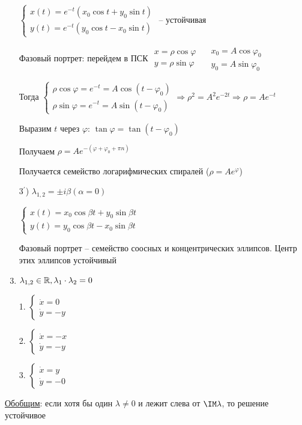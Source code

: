 \documentclass[12pt]{article}
\begin{document}
\begin{enumerate}[label*=\arabic*) ]
        $\begin{cases}x(t) = e^{-t} (x_0 \cos t + y_0 \sin t) \\ y(t) = e^{-t} (y_0 \cos t - x_0 \sin t)\end{cases}$ -- устойчивая

        Фазовый портрет: перейдем в ПСК $\begin{matrix}x = \rho \cos \varphi \\ y = \rho \sin \varphi\end{matrix} \quad \begin{matrix}x_0 = A\cos \varphi_0 \\ y_0 = A \sin \varphi_0\end{matrix}$

        Тогда $\begin{cases}\rho \cos \varphi = e^{-t} = A \cos (t - \varphi_0) \\ \rho \sin \varphi = e^{-t} = A \sin (t - \varphi_0)\end{cases} \Longrightarrow
        \rho^2 = A^2 e^{-2t} \Longrightarrow \rho = Ae^{-t}$

        Выразим $t$ через $\varphi$: $\tan \varphi = \tan (t - \varphi_0)$

        Получаем $\rho = Ae^{-(\varphi + \varphi_0 + \pi n)}$

        Получается семейство логарифмических спиралей ($\rho = Ae^{\varphi}$)

        \item[3$^\prime$)] $\lambda_{1,2} = \pm i\beta (\alpha = 0)$

        $\begin{cases}x(t) = x_0 \cos \beta t + y_0 \sin \beta t \\ y(t) = y_0 \cos \beta t - x_0 \sin \beta t\end{cases}$

        Фазовый портрет -- семейство соосных и концентрических эллипсов. Центр этих эллипсов устойчивый

        \item $\lambda_{1,2} \in \mathbb{R}, \lambda_1 \cdot \lambda_2 = 0$

        \Lab

        1. $\begin{cases}\dot x = 0 \\ \dot y = -y\end{cases}$

        2. $\begin{cases}\dot x = -x \\ \dot y = -y\end{cases}$

        3. $\begin{cases}\dot x = y \\ \dot y = -0\end{cases}$
    \end{enumerate}

    \underline{Обобщим}: если хотя бы один $\lambda \neq 0$ и лежит слева от $\IM \lambda$, то решение устойчивое
\end{document}

